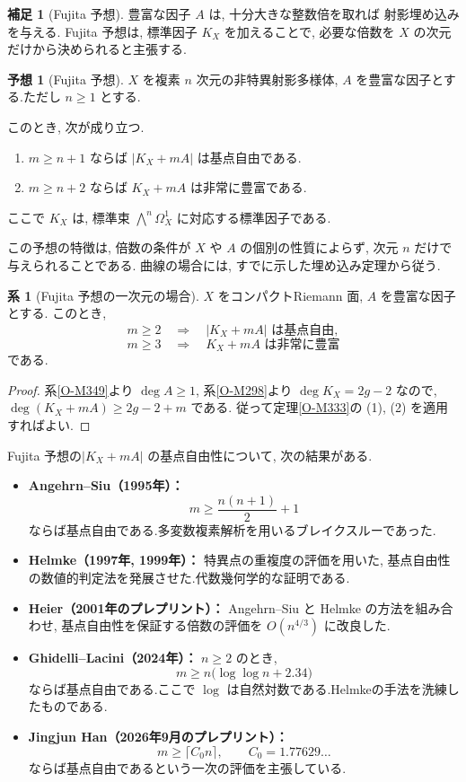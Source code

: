 \documentclass[dvipdfmx,a4paper,11pt]{article} %
\theoremstyle{definition}
\numberwithin{equation}{section}
\newtheorem{cor}[thm]{系}
\newtheorem{rem}[thm]{補足}
\newtheorem{conj}[thm]{予想}
\begin{document}
\begin{rem}[Fujita 予想]
豊富な因子 $A$ は, 十分大きな整数倍を取れば
射影埋め込みを与える.
Fujita 予想は, 標準因子 $K_X$ を加えることで, 
必要な倍数を $X$ の次元だけから決められると主張する.

\begin{conj}[Fujita 予想]
$X$ を複素 $n$ 次元の非特異射影多様体, 
$A$ を豊富な因子とする.ただし $n\geq1$ とする.


このとき, 次が成り立つ.
\begin{enumerate}
\item $m\geq n+1$ ならば $|K_X+mA|$ は基点自由である.
\item $m\geq n+2$ ならば $K_X+mA$ は非常に豊富である.
\end{enumerate}
ここで $K_X$ は, 標準束
$\bigwedge^n\Omega_X^1$ に対応する標準因子である.
\end{conj}

この予想の特徴は, 倍数の条件が
$X$ や $A$ の個別の性質によらず, 
次元 $n$ だけで与えられることである.
曲線の場合には, すでに示した埋め込み定理から従う.

\begin{cor}[Fujita 予想の一次元の場合]
$X$ をコンパクトRiemann 面, $A$ を豊富な因子とする.
このとき, 
\[
m\geq2
\quad\Longrightarrow\quad
|K_X+mA|\text{ は基点自由},
\]
\[
m\geq3
\quad\Longrightarrow\quad
K_X+mA\text{ は非常に豊富}
\]
である.
\end{cor}

\begin{proof}
系\ref{O-M349}より $\deg A\geq1$, 系\ref{O-M298}より $\deg K_X=2g-2$ なので,
$\deg(K_X+mA)\geq2g-2+m$ である. 従って定理\ref{O-M333}の (1), (2) を適用すればよい.
\end{proof}

Fujita 予想の$|K_X+mA|$ の基点自由性について, 次の結果がある.

\begin{itemize}
\item
\textbf{Angehrn--Siu（1995年）：}
\[
m\geq\frac{n(n+1)}2+1
\]
ならば基点自由である.多変数複素解析を用いるブレイクスルーであった. 

\item
\textbf{Helmke（1997年, 1999年）：}
特異点の重複度の評価を用いた, 
基点自由性の数値的判定法を発展させた.代数幾何学的な証明である. 

\item
\textbf{Heier（2001年のプレプリント）：}
Angehrn--Siu と Helmke の方法を組み合わせ, 
基点自由性を保証する倍数の評価を
$O(n^{4/3})$ に改良した.

\item
\textbf{Ghidelli--Lacini（2024年）：}
$n\geq2$ のとき, 
\[
m\geq n\bigl(\log\log n+2.34\bigr)
\]
ならば基点自由である.ここで $\log$ は自然対数である.Helmkeの手法を洗練したものである. 

\item
\textbf{Jingjun Han（2026年9月のプレプリント）：}
\[
m\geq\lceil C_0n\rceil,\qquad C_0=1.77629\ldots
\]
ならば基点自由であるという一次の評価を主張している.
\end{itemize}

\end{rem}
\end{document}
